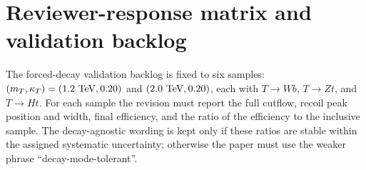 \documentclass[a4paper,11pt]{article}
\begin{document}
\section{Reviewer-response matrix and validation backlog}
\label{app:response}


The forced-decay validation backlog is fixed to six samples:
$(m_T,\kappa_T)=(1.2~{\rm TeV},0.20)$ and $(2.0~{\rm TeV},0.20)$, each with
$T\to Wb$, $T\to Zt$, and $T\to Ht$.  For each sample the revision must report
the full cutflow, recoil peak position and width, final efficiency, and the
ratio of the efficiency to the inclusive sample.  The decay-agnostic wording is
kept only if these ratios are stable within the assigned systematic
uncertainty; otherwise the paper must use the weaker phrase
``decay-mode-tolerant''.



\end{document}

